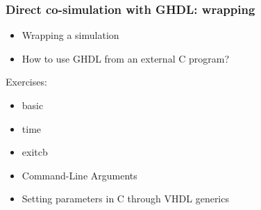 \documentclass[xcolor={usenames,dvipsnames}]{beamer}
\begin{document}
\begin{frame}
\frametitle{Direct co-simulation with GHDL: wrapping}

\begin{itemize}
\item Wrapping a simulation \href{https://ghdl.github.io/ghdl-cosim/vhpidirect/wrapping.html}{\faBook}
\item How to use GHDL from an external C program? \href{https://ghdl.github.io/ghdl-cosim/vhpidirect/notebook/howtouseghdlfromc.html}{\faBook}
\end{itemize}

\vfill

Exercises:
\begin{itemize}
\item basic
\href{https://ghdl.github.io/ghdl-cosim/vhpidirect/examples/quickstart.html\#basic}{\faBook}
\href{https://github.com/ghdl/ghdl-cosim/blob/master/vhpidirect/quickstart/wrapping/basic}{\faCode}

\item time
\href{https://ghdl.github.io/ghdl-cosim/vhpidirect/examples/quickstart.html\#time}{\faBook}
\href{https://github.com/ghdl/ghdl-cosim/blob/master/vhpidirect/quickstart/wrapping/time}{\faCode}

\item exitcb
\href{https://ghdl.github.io/ghdl-cosim/vhpidirect/examples/quickstart.html\#exitcb}{\faBook}
\href{https://github.com/ghdl/ghdl-cosim/blob/master/vhpidirect/quickstart/wrapping/exitcb}{\faCode}

\item Command-Line Arguments
\href{https://ghdl.github.io/ghdl-cosim/vhpidirect/examples/quickstart.html\#command-line-arguments}{\faBook}
\href{https://github.com/ghdl/ghdl-cosim/blob/master/vhpidirect/quickstart/cli}{\faCode}

\item Setting parameters in C through VHDL generics
\href{https://ghdl.github.io/ghdl-cosim/vhpidirect/examples/quickstart.html\#setting-parameters-in-c-through-vhdl-generics}{\faBook}
\href{https://github.com/ghdl/ghdl-cosim/blob/master/vhpidirect/quickstart/cli/fcngen}{\faCode}
\end{itemize}
\end{frame}
\end{document}
